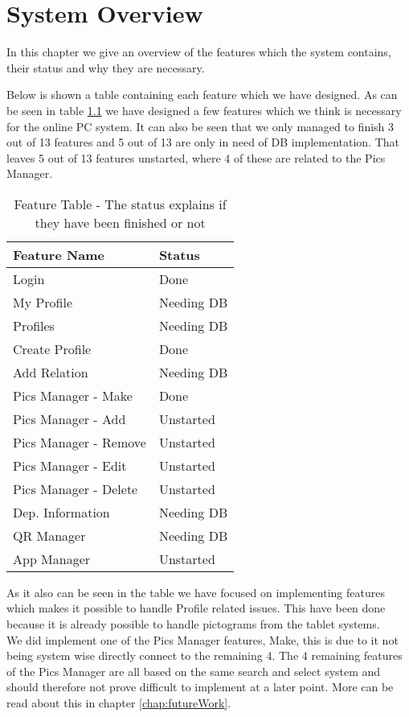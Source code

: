 \chapter{System Overview}
\label{chap:systemOverview}
In this chapter we give an overview of the features which the system contains, their status and why they are necessary.

Below is shown a table containing each feature which we have designed. As can be seen in table \ref{tab:FeatureTable} we have designed a few features which we think is necessary for the online PC system. It can also be seen that we only managed to finish 3 out of 13 features and 5 out of 13 are only in need of DB implementation. That leaves 5 out of 13 features unstarted, where 4 of these are related to the Pics Manager.

\begin{table}[htbp]
	\centering
		\begin{tabular}{|l|l|}
			\hline
			Feature Name & Status\\\hline \hline
			Login & Done \\\hline
			My Profile & Needing DB\\\hline
			Profiles & Needing DB\\\hline
			Create Profile & Done\\\hline
			Add Relation & Needing DB\\\hline
			Pics Manager - Make & Done\\\hline
			Pics Manager - Add & Unstarted\\\hline
			Pics Manager - Remove & Unstarted\\\hline
			Pics Manager - Edit & Unstarted\\\hline
			Pics Manager - Delete & Unstarted\\\hline
			Dep. Information & Needing DB\\\hline
			QR Manager & Needing DB\\\hline
			App Manager & Unstarted\\\hline
		\end{tabular}
	\caption{Feature Table - The status explains if they have been finished or not}
	\label{tab:FeatureTable}
\end{table}

As it also can be seen in the table we have focused on implementing features which makes it possible to handle Profile related issues. This have been done because it is already possible to handle pictograms from the tablet systems.\\
We did implement one of the Pics Manager features, Make, this is due to it not being system wise directly connect to the remaining 4. The 4 remaining features of the Pics Manager are all based on the same search and select system and should therefore not prove difficult to implement at a later point. More can be read about this in chapter \vref{chap:futureWork}.


